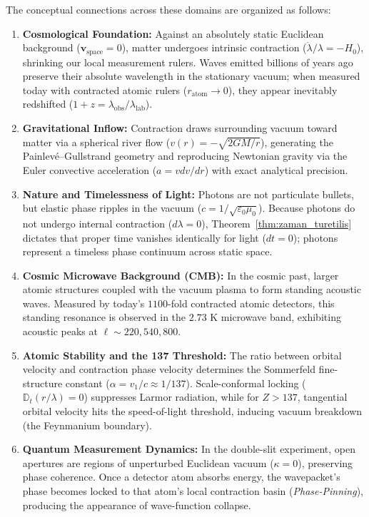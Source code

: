 The conceptual connections across these domains are organized as follows:
\begin{enumerate}
    \item \textbf{Cosmological Foundation:} Against an absolutely static Euclidean background ($\mathbf{v}_{\mathrm{space}}=0$), matter undergoes intrinsic contraction ($\dot{\lambda}/\lambda = -H_0$), shrinking our local measurement rulers. Waves emitted billions of years ago preserve their absolute wavelength in the stationary vacuum; when measured today with contracted atomic rulers ($r_{\mathrm{atom}} \to 0$), they appear inevitably redshifted ($1+z = \lambda_{\mathrm{obs}}/\lambda_{\mathrm{lab}}$).
    \item \textbf{Gravitational Inflow:} Contraction draws surrounding vacuum toward matter via a spherical river flow ($v(r) = -\sqrt{2GM/r}$), generating the Painlev\'e--Gullstrand geometry and reproducing Newtonian gravity via the Euler convective acceleration ($a = v dv/dr$) with exact analytical precision.
    \item \textbf{Nature and Timelessness of Light:} Photons are not particulate bullets, but elastic phase ripples in the vacuum ($c = 1/\sqrt{\varepsilon_0\mu_0}$). Because photons do not undergo internal contraction ($d\lambda = 0$), Theorem~\ref{thm:zaman_turetilis} dictates that proper time vanishes identically for light ($dt = 0$); photons represent a timeless phase continuum across static space.
    \item \textbf{Cosmic Microwave Background (CMB):} In the cosmic past, larger atomic structures coupled with the vacuum plasma to form standing acoustic waves. Measured by today's $1100$-fold contracted atomic detectors, this standing resonance is observed in the $2.73\text{ K}$ microwave band, exhibiting acoustic peaks at $\ell \sim 220, 540, 800$.
    \item \textbf{Atomic Stability and the 137 Threshold:} The ratio between orbital velocity and contraction phase velocity determines the Sommerfeld fine-structure constant ($\alpha = v_1/c \approx 1/137$). Scale-conformal locking ($\mathbb{D}_t(r/\lambda)=0$) suppresses Larmor radiation, while for $Z > 137$, tangential orbital velocity hits the speed-of-light threshold, inducing vacuum breakdown (the Feynmanium boundary).
    \item \textbf{Quantum Measurement Dynamics:} In the double-slit experiment, open apertures are regions of unperturbed Euclidean vacuum ($\kappa=0$), preserving phase coherence. Once a detector atom absorbs energy, the wavepacket's phase becomes locked to that atom's local contraction basin (\textit{Phase-Pinning}), producing the appearance of wave-function collapse.

\end{enumerate}
